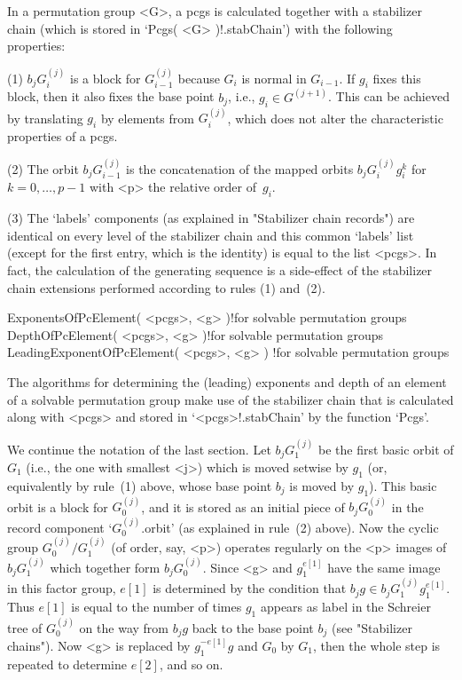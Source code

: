 \danger In a permutation group <G>, a pcgs  is calculated together with a
stabilizer chain (which is stored  in `Pcgs( <G> )!.stabChain') with  the
following properties:

(1) $b_jG_i^{(j)}$ is a block for $G_{i-1}^{(j)}$ because $G_i$ is normal
in $G_{i-1}$. If  $g_i$  fixes this block,   then it also fixes the  base
point    $b_j$, i.e.,  $g_i   \in  G^{(j+1)}$.  This can  be  achieved by
translating $g_i$ by elements from $G_i^{(j)}$, which  does not alter the
characteristic properties of a pcgs.

(2)  The  orbit $b_jG_{i-1}^{(j)}$ is   the  concatenation of the  mapped
orbits $b_jG_i^{(j)}g_i^k$ for  $k=0,\ldots,  p-1$ with <p>  the relative
order of~$g_i$.

(3) The `labels' components  (as explained in "Stabilizer chain records")
are  identical  on every level  of  the stabilizer chain  and this common
`labels' list  (except  for the first  entry, which  is the  identity) is
equal  to  the list <pcgs>.  In fact,  the calculation of  the generating
sequence  is a side-effect of  the  stabilizer chain extensions performed
according to rules (1) and~(2).

\>ExponentsOfPcElement( <pcgs>, <g> )!{for solvable permutation groups}
\>DepthOfPcElement( <pcgs>, <g> )!{for solvable permutation groups}
\>LeadingExponentOfPcElement( <pcgs>, <g> )%
  !{for solvable permutation groups}

The algorithms  for determining the  (leading) exponents and  depth of an
element of a solvable permutation group make use  of the stabilizer chain
that is calculated along with <pcgs> and stored in `<pcgs>!.stabChain' by
the function `Pcgs'.

\danger We continue the notation of the  last section. Let $b_jG_1^{(j)}$
be the first basic orbit of $G_1$ (i.e., the one with smallest <j>) which
is moved setwise by $g_1$ (or, equivalently by rule~(1) above, whose base
point $b_j$ is moved    by $g_1$). This   basic  orbit  is a  block   for
$G_0^{(j)}$, and it  is stored as an  initial piece of  $b_jG_0^{(j)}$ in
the   record component  `$G_0^{(j)}$.orbit'  (as  explained  in  rule~(2)
above). Now  the cyclic group  $G_0^{(j)}/G_1^{(j)}$ (of order, say, <p>)
operates regularly  on the  <p> images  of $b_jG_1^{(j)}$ which  together
form  $b_jG_0^{(j)}$. Since <g> and $g_1^{e[1]}$   have the same image in
this factor group, $e[1]$ is  determined by the  condition that $b_jg \in
b_jG_1^{(j)} g_1^{e[1]}$. Thus $e[1]$  is  equal to  the number  of times
$g_1$ appears as label  in the Schreier   tree of $G_0^{(j)}$ on the  way
from $b_jg$ back  to the base  point $b_j$ (see "Stabilizer chains"). Now
<g> is replaced by $g_1^{-e[1]}g$ and $G_0$ by $G_1$, then the whole step
is repeated to determine $e[2]$, and so on.

